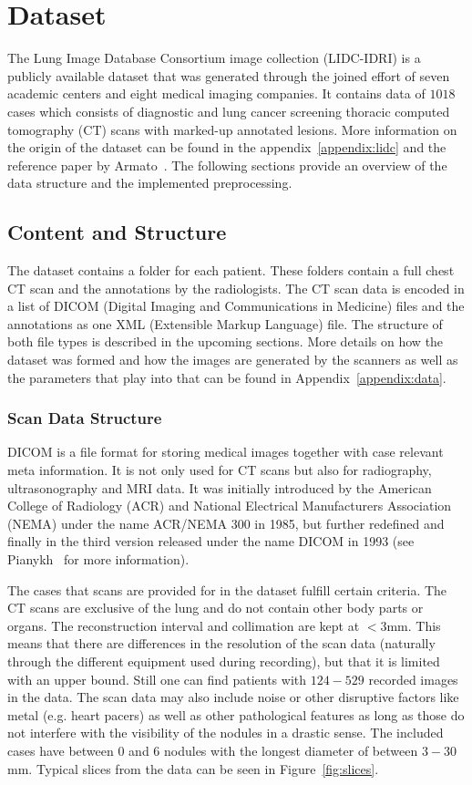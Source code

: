 \documentclass[../Thesis.tex]{subfiles}
\begin{document}
\chapter{Dataset}\label{chap:data}
The Lung Image Database Consortium image collection (LIDC-IDRI) is a publicly available dataset that was generated through the joined effort of seven academic centers and eight medical imaging companies. It contains data of $1018$ cases which consists of diagnostic and lung cancer screening thoracic computed tomography (CT) scans with marked-up annotated lesions. More information on the origin of the dataset can be found in the appendix~\ref{appendix:lidc} and the reference paper by Armato~\cite{armato2011lung}. The following sections provide an overview of the data structure and the implemented preprocessing.

\section{Content and Structure}
The dataset contains a folder for each patient. These folders contain a full chest CT scan and the annotations by the radiologists. The CT scan data is encoded in a list of DICOM (Digital Imaging and Communications in Medicine) files and the annotations as one XML (Extensible Markup Language) file. The structure of both file types is described in the upcoming sections. More details on how the dataset was formed and how the images are generated by the scanners as well as the parameters that play into that can be found in Appendix~\ref{appendix:data}.

\subsection{Scan Data Structure}
DICOM is a file format for storing medical images together with case relevant meta information. It is not only used for CT scans but also for radiography, ultrasonography and MRI data. It was initially introduced by the American College of Radiology (ACR) and National Electrical Manufacturers Association (NEMA) under the name ACR/NEMA 300 in 1985, but further redefined and finally in the third version released under the name DICOM in 1993 (see Pianykh~\cite{pianykh2008} for more information).

The cases that scans are provided for in the dataset fulfill certain criteria. The CT scans are exclusive of the lung and do not contain other body parts or organs. The reconstruction interval and collimation are kept at $<3$mm. This means that there are differences in the resolution of the scan data (naturally through the different equipment used during recording), but that it is limited with an upper bound. Still one can find patients with $124-529$ recorded images in the data. The scan data may also include noise or other disruptive factors like metal (e.g. heart pacers) as well as other pathological features as long as those do not interfere with the visibility of the nodules in a drastic sense. The included cases have between $0$ and $6$ nodules with the longest diameter of between $3-30$ mm. Typical slices from the data can be seen in Figure~\ref{fig:slices}.
\end{document}
